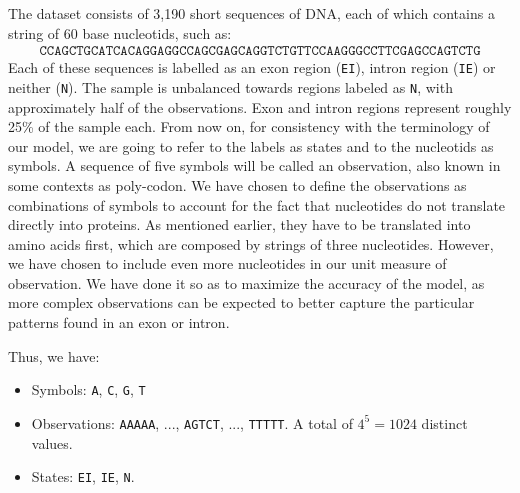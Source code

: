 \documentclass[a4paper, 11pt]{article} %
\begin{document}
The dataset consists of 3,190 short sequences of DNA, each of which contains a string of 60 base nucleotids, such as:
\begin{eqnarray}
\texttt{CCAGCTGCATCACAGGAGGCCAGCGAGCAGGTCTGTTCCAAGGGCCTTCGAGCCAGTCTG}  \nonumber
\end{eqnarray}
Each of these sequences is labelled as an exon region (\texttt{EI}), intron region (\texttt{IE}) or neither (\texttt{N}). The sample is unbalanced towards regions labeled as \texttt{N}, with approximately half of the observations. Exon and intron regions represent roughly 25\% of the sample each. From now on, for consistency with the terminology of our model, we are going to refer to the labels as states and to the nucleotids as symbols. A sequence of five symbols will be called an observation, also known in some contexts as poly-codon. We have chosen to define the observations as combinations of symbols to account for the fact that nucleotides do not translate directly into proteins. As mentioned earlier, they have to be translated into amino acids first, which are composed by strings of three nucleotides. However, we have chosen to include even more nucleotides in our unit measure of observation. We have done it so as to maximize the accuracy of the model, as more complex observations can be expected to better capture the particular patterns found in an exon or intron.

Thus, we have:
\begin{itemize}
\item Symbols: \texttt{A}, \texttt{C}, \texttt{G}, \texttt{T}
\item Observations: \texttt{AAAAA}, ..., \texttt{AGTCT}, ..., \texttt{TTTTT}. A total of $4^5=1024$ distinct values.
\item States: \texttt{EI}, \texttt{IE}, \texttt{N}.
\end{itemize}
\end{document}
